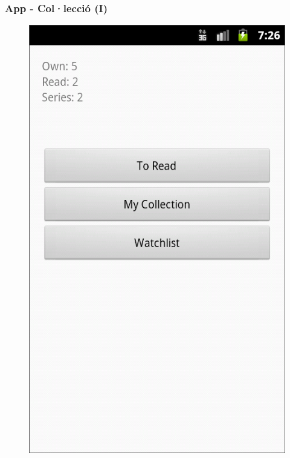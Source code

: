 \documentclass{beamer}
\begin{document}
	\begin{frame}
	\frametitle{App - Col·lecció (I)}
		\begin{figure}
			\centering
			\includegraphics[scale=0.23]{collection_menu.png}\hspace*{3ex}	

\end{figure}
\end{frame}
\end{document}
